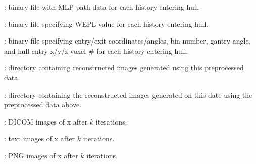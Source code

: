 \documentclass[landscape,12pt]{article}
\begin{document}
\begin{myEnumerate}[labelindent=1pt, leftmargin=*]
\begin{myEnumerate}[labelindent=1pt, leftmargin=*]
\begin{myEnumerate}[labelindent=1pt, leftmargin=*]
\begin{myEnumerate}[labelindent=1pt, leftmargin=*]
\begin{myEnumerate}[labelindent=1pt, leftmargin=*]
\begin{myEnumerate}[labelindent=1pt, leftmargin=*]
\begin{myEnumerate}[labelindent=1pt, leftmargin=*]
\begin{myEnumerate}[labelindent=1pt, leftmargin=*]
\begin{myEnumerate}[labelindent=1pt, leftmargin=*]
                                        \item {} \color{Black}: binary file with MLP path data for each history entering hull.
                                        \item {} \color{Black}: binary file specifying WEPL value for each history entering hull.
                                        \item {} \color{Black}: binary file specifying entry/exit coordinates/angles, bin number, gantry angle, and hull entry x/y/z voxel \# for each history entering hull.
                                        \item {} \color{Black}: directory containing reconstructed images generated using this preprocessed data.
                                        \begin{myEnumerate}[labelindent=1pt, leftmargin=*]
                                            \item {} \color{Black}: directory containing the reconstructed images generated on this date using the preprocessed data above.
                                                \begin{myEnumerate}[labelindent=1pt, leftmargin=*]
                                                    \item {} \color{Black}: DICOM images of x after $k$ iterations.
                                                    \item {} \color{Black}: text images of x after $k$ iterations.
                                                    \item {} \color{Black}: PNG images of x after $k$ iterations.
                                                \end{myEnumerate}
                                        \end{myEnumerate}
                                    \end{myEnumerate}
                                \end{myEnumerate}
                            \end{myEnumerate}
                        \end{myEnumerate}

\end{myEnumerate}
\end{myEnumerate}
\end{myEnumerate}
\end{myEnumerate}
\end{myEnumerate}
\end{document}
